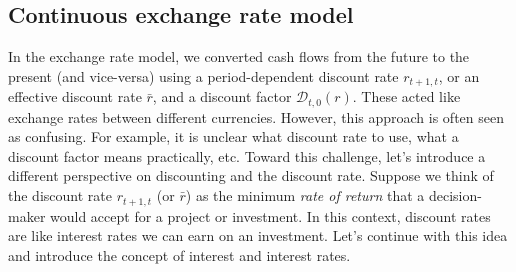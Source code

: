 \documentclass[11pt]{article}
\theoremstyle{definition}
\newcommand{\newterm}[1]{{\it #1}}
\begin{document}
\subsection{Continuous exchange rate model}
In the exchange rate model, we converted cash flows from the future to the present (and vice-versa) using a period-dependent discount rate $r_{t+1,t}$, 
or an effective discount rate $\bar{r}$, and a discount factor $\mathcal{D}_{t,0}(r)$. These acted like exchange rates between different currencies.
However, this approach is often seen as confusing. For example, it is unclear what discount rate to use, what a discount factor means practically, etc.
Toward this challenge, let's introduce a different perspective on discounting and the discount rate.
Suppose we think of the discount rate $r_{t+1,t}$  (or $\bar{r}$) as the minimum 
\newterm{rate of return} that a decision-maker 
would accept for a project or investment. In this context, discount rates are like interest rates we can earn on an investment.
Let's continue with this idea and introduce the concept of interest and interest rates.
\end{document}
